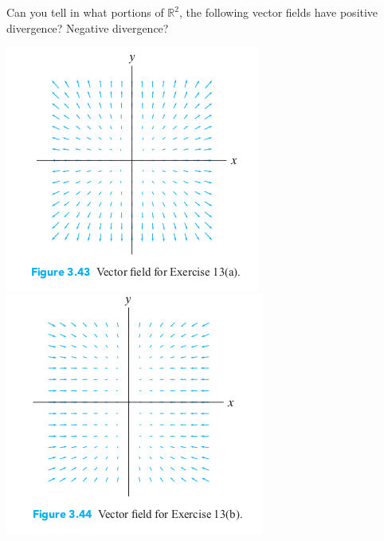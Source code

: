 \documentclass[11pt,letterpaper,boxed]{hmcpset}
\newcommand{\R}{\mathbb{R}}
\begin{document}
\begin{problem}[Colley 3.4 \#13]
Can you tell in what portions of $\R^2$, the following vector fields have positive divergence? Negative divergence?\\

\begin{center}
\includegraphics[scale=0.55]{grapA.png} \qquad
\includegraphics[scale=0.55]{grapB.png}


\end{center}
\end{problem}
\end{document}
